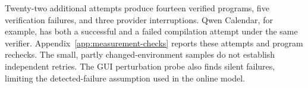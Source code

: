 Twenty-two additional attempts produce fourteen verified programs, five verification failures, and three provider interruptions.
Qwen Calendar, for example, has both a successful and a failed compilation attempt under the same verifier.
Appendix~\ref{app:measurement-checks} reports these attempts and program rechecks.
The small, partly changed-environment samples do not establish independent retries.
The GUI perturbation probe also finds silent failures, limiting the detected-failure assumption used in the online model.
